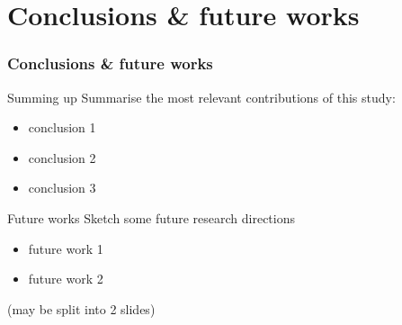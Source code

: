 \documentclass[presentation]{beamer}\mode<presentation>{\usetheme{blackAMSBolognaFC}}
\begin{document}
\section{Conclusions \& future works}

\begin{frame}%
\frametitle{Conclusions \& future works}

\begin{block}{Summing up}
    Summarise the most relevant contributions of this study:
    \begin{itemize}
        \item conclusion 1
        \item conclusion 2
        \item conclusion 3
    \end{itemize}
\end{block}

\begin{exampleblock}{Future works}
    Sketch some future research directions
    \begin{itemize}
        \item future work 1
        \item future work 2
    \end{itemize}
\end{exampleblock}

(may be split into 2 slides)

\end{frame}

\section*{}
\frame{\titlepage}
\end{document}
